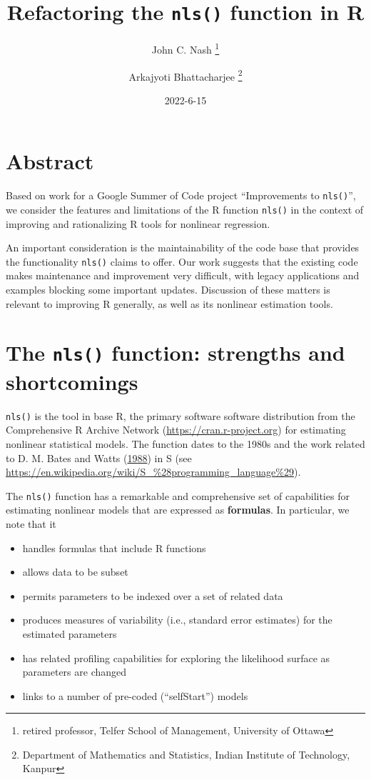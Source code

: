 \documentclass[
]{article}
\title{Refactoring the \texttt{nls()} function in R}
\author{John C. Nash
\thanks{ retired professor, Telfer School of Management, University of Ottawa} \and Arkajyoti
Bhattacharjee
\thanks{Department of Mathematics and Statistics, Indian Institute of Technology, Kanpur}}
\date{2022-6-15}
\providecommand{\tightlist}{%
  \setlength{\itemsep}{0pt}\setlength{\parskip}{0pt}}
\begin{document}
\maketitle

{
\hypersetup{linkcolor=}
\setcounter{tocdepth}{2}
\tableofcontents
}
\hypertarget{abstract}{%
\section{Abstract}\label{abstract}}

Based on work for a Google Summer of Code project ``Improvements to
\texttt{nls()}'', we consider the features and limitations of the R
function \texttt{nls()} in the context of improving and rationalizing R
tools for nonlinear regression.

An important consideration is the maintainability of the code base that
provides the functionality \texttt{nls()} claims to offer. Our work
suggests that the existing code makes maintenance and improvement very
difficult, with legacy applications and examples blocking some important
updates. Discussion of these matters is relevant to improving R
generally, as well as its nonlinear estimation tools.

\hypertarget{the-nls-function-strengths-and-shortcomings}{%
\section{\texorpdfstring{The \texttt{nls()} function: strengths and
shortcomings}{The nls() function: strengths and shortcomings}}\label{the-nls-function-strengths-and-shortcomings}}

\texttt{nls()} is the tool in base R, the primary software software
distribution from the Comprehensive R Archive Network
(\url{https://cran.r-project.org}) for estimating nonlinear statistical
models. The function dates to the 1980s and the work related to D. M.
Bates and Watts (\protect\hyperlink{ref-bateswatts}{1988}) in S (see
\url{https://en.wikipedia.org/wiki/S_\%28programming_language\%29}).

The \texttt{nls()} function has a remarkable and comprehensive set of
capabilities for estimating nonlinear models that are expressed as
\textbf{formulas}. In particular, we note that it

\begin{itemize}
\tightlist
\item
  handles formulas that include R functions
\item
  allows data to be subset
\item
  permits parameters to be indexed over a set of related data
\item
  produces measures of variability (i.e., standard error estimates) for
  the estimated parameters
\item
  has related profiling capabilities for exploring the likelihood
  surface as parameters are changed
\item
  links to a number of pre-coded (``selfStart'') models
\end{itemize}
\end{document}
